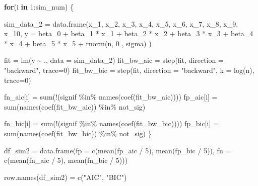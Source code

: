 \documentclass[
]{article}
\newenvironment{Shaded}{\begin{snugshade}}{\end{snugshade}}
\newcommand{\AttributeTok}[1]{\textcolor[rgb]{0.77,0.63,0.00}{#1}}
\newcommand{\ControlFlowTok}[1]{\textcolor[rgb]{0.13,0.29,0.53}{\textbf{#1}}}
\newcommand{\DecValTok}[1]{\textcolor[rgb]{0.00,0.00,0.81}{#1}}
\newcommand{\FunctionTok}[1]{\textcolor[rgb]{0.00,0.00,0.00}{#1}}
\newcommand{\NormalTok}[1]{#1}
\newcommand{\OtherTok}[1]{\textcolor[rgb]{0.56,0.35,0.01}{#1}}
\newcommand{\SpecialCharTok}[1]{\textcolor[rgb]{0.00,0.00,0.00}{#1}}
\newcommand{\StringTok}[1]{\textcolor[rgb]{0.31,0.60,0.02}{#1}}
\begin{document}
\begin{Shaded}
\begin{Highlighting}[]
\ControlFlowTok{for}\NormalTok{(i }\ControlFlowTok{in} \DecValTok{1}\SpecialCharTok{:}\NormalTok{sim\_num) \{}
  
\NormalTok{  sim\_data\_2 }\OtherTok{=} \FunctionTok{data.frame}\NormalTok{(x\_1, x\_2, x\_3, x\_4, x\_5, x\_6, x\_7, x\_8, x\_9, x\_10,}
    \AttributeTok{y =}\NormalTok{ beta\_0 }\SpecialCharTok{+}\NormalTok{ beta\_1 }\SpecialCharTok{*}\NormalTok{ x\_1 }\SpecialCharTok{+}\NormalTok{ beta\_2 }\SpecialCharTok{*}\NormalTok{ x\_2 }\SpecialCharTok{+}\NormalTok{ beta\_3 }\SpecialCharTok{*}\NormalTok{ x\_3 }\SpecialCharTok{+}\NormalTok{ beta\_4 }\SpecialCharTok{*}\NormalTok{ x\_4 }\SpecialCharTok{+} 
\NormalTok{        beta\_5 }\SpecialCharTok{*}\NormalTok{ x\_5 }\SpecialCharTok{+} \FunctionTok{rnorm}\NormalTok{(n, }\DecValTok{0}\NormalTok{ , sigma)}
\NormalTok{  )}
  
\NormalTok{  fit }\OtherTok{=} \FunctionTok{lm}\NormalTok{(y }\SpecialCharTok{\textasciitilde{}}\NormalTok{ ., }\AttributeTok{data =}\NormalTok{ sim\_data\_2)}
\NormalTok{  fit\_bw\_aic }\OtherTok{=} \FunctionTok{step}\NormalTok{(fit, }\AttributeTok{direction =} \StringTok{"backward"}\NormalTok{, }\AttributeTok{trace=}\DecValTok{0}\NormalTok{)}
\NormalTok{  fit\_bw\_bic }\OtherTok{=} \FunctionTok{step}\NormalTok{(fit, }\AttributeTok{direction =} \StringTok{"backward"}\NormalTok{, }\AttributeTok{k =} \FunctionTok{log}\NormalTok{(n), }\AttributeTok{trace=}\DecValTok{0}\NormalTok{)}
  
\NormalTok{  fn\_aic[i] }\OtherTok{=} \FunctionTok{sum}\NormalTok{(}\SpecialCharTok{!}\NormalTok{(signif }\SpecialCharTok{\%in\%} \FunctionTok{names}\NormalTok{(}\FunctionTok{coef}\NormalTok{(fit\_bw\_aic))))}
\NormalTok{  fp\_aic[i] }\OtherTok{=} \FunctionTok{sum}\NormalTok{(}\FunctionTok{names}\NormalTok{(}\FunctionTok{coef}\NormalTok{(fit\_bw\_aic)) }\SpecialCharTok{\%in\%}\NormalTok{ not\_sig)}
  
  
\NormalTok{  fn\_bic[i] }\OtherTok{=} \FunctionTok{sum}\NormalTok{(}\SpecialCharTok{!}\NormalTok{(signif }\SpecialCharTok{\%in\%} \FunctionTok{names}\NormalTok{(}\FunctionTok{coef}\NormalTok{(fit\_bw\_bic))))}
\NormalTok{  fp\_bic[i] }\OtherTok{=} \FunctionTok{sum}\NormalTok{(}\FunctionTok{names}\NormalTok{(}\FunctionTok{coef}\NormalTok{(fit\_bw\_bic)) }\SpecialCharTok{\%in\%}\NormalTok{ not\_sig)}
\NormalTok{\}}

\NormalTok{df\_sim2 }\OtherTok{=} \FunctionTok{data.frame}\NormalTok{(}\AttributeTok{fp =} \FunctionTok{c}\NormalTok{(}\FunctionTok{mean}\NormalTok{(fp\_aic }\SpecialCharTok{/} \DecValTok{5}\NormalTok{), }\FunctionTok{mean}\NormalTok{(fp\_bic }\SpecialCharTok{/} \DecValTok{5}\NormalTok{)), }
                \AttributeTok{fn =} \FunctionTok{c}\NormalTok{(}\FunctionTok{mean}\NormalTok{(fn\_aic }\SpecialCharTok{/} \DecValTok{5}\NormalTok{), }\FunctionTok{mean}\NormalTok{(fn\_bic }\SpecialCharTok{/} \DecValTok{5}\NormalTok{)))}

\FunctionTok{row.names}\NormalTok{(df\_sim2) }\OtherTok{=} \FunctionTok{c}\NormalTok{(}\StringTok{"AIC"}\NormalTok{, }\StringTok{"BIC"}\NormalTok{)}
\end{Highlighting}
\end{Shaded}
\end{document}
